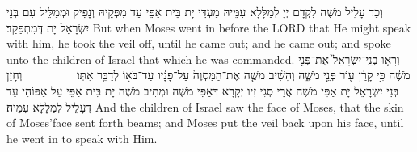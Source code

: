 {{{}}
{וְכַד עָלֵיל מֹשֶׁה לִקְדָם יְיָ לְמַלָּלָא עִמֵּיהּ מַעְדֵּי יָת בֵּית אַפֵּי עַד מִפְּקֵיהּ וְנָפֵיק וּמְמַלֵּיל עִם בְּנֵי יִשְׂרָאֵל יָת דְּמִתְפַּקַּד׃}
{But when Moses went in before the LORD that He might speak with him, he took the veil off, until he came out; and he came out; and spoke unto the children of Israel that which he was commanded.}{}
{וְרָא֤וּ בְנֵֽי־יִשְׂרָאֵל֙ אֶת־פְּנֵ֣י מֹשֶׁ֔ה כִּ֣י קָרַ֔ן ע֖וֹר פְּנֵ֣י מֹשֶׁ֑ה וְהֵשִׁ֨יב מֹשֶׁ֤ה אֶת־הַמַּסְוֶה֙ עַל־פָּנָ֔יו עַד־בֹּא֖וֹ לְדַבֵּ֥ר אִתּֽוֹ׃ \setuma         
}
{וְחָזַן בְּנֵי יִשְׂרָאֵל יָת אַפֵּי מֹשֶׁה אֲרֵי סְגִי זִיו יְקָרָא דְּאַפֵּי מֹשֶׁה וּמְתִיב מֹשֶׁה יָת בֵּית אַפֵּי עַל אַפּוֹהִי עַד דְּעָלֵיל לְמַלָּלָא עִמֵּיהּ׃}
{And the children of Israel saw the face of Moses, that the skin of Moses’face sent forth beams; and Moses put the veil back upon his face, until he went in to speak with Him.}{}
\newperek
}
